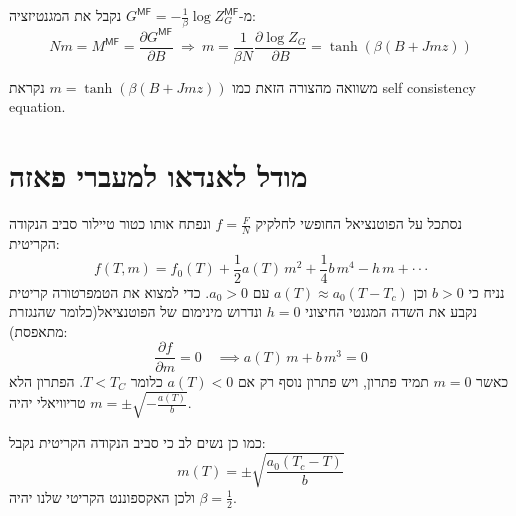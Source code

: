 \documentclass{tstextbook}
\begin{document}
\begin{corollary}
מ-\(G^{\mathsf{M F}}=-\frac{1}{\beta}\log Z_{G}^{\mathsf{M F}}\) נקבל את המגנטיזציה:
$$N m=M^{\mathsf{M F}}=\frac{\partial G^{\mathsf{M F}}}{\partial B}\ \Rightarrow\ m=\frac{1}{\beta N}\frac{\partial\log Z_{G}}{\partial B}=\operatorname{tanh}\left(\beta\left(B+J m z\right)\right)$$

\end{corollary}
\begin{remark}
משוואה מהצורה הזאת כמו \(m=\tanh\left( \beta (B+Jmz) \right)\) נקראת self consistency equation. 

\end{remark}
\section{מודל לאנדאו למעברי פאזה}

נסתכל על הפוטנציאל החופשי לחלקיק \(f=\frac{F}{N}\) ונפתח אותו כטור טיילור סביב הנקודה הקריטית:
$$f(T,m)=f_{0}(T)+{\textstyle{\frac{1}{2}}}a(T)\,m^{2}+{\textstyle{\frac{1}{4}}}b\,m^{4}-h\,m+\cdot\cdot\cdot$$
נניח כי \(b> 0\) וכן \(a(T)\approx a_{0}(T-T_{c})\) עם \(a_{0}> 0\). כדי למצוא את הטמפרטורה קריטית נקבע את השדה המגנטי החיצוני \(h=0\) ונדרוש מינימום של הפוטנציאל(כלומר שהנגזרת מתאפסת):
$$\frac{\partial f}{\partial m}=0\quad\implies a(T)\,m+b\,m^{3}=0$$
כאשר \(m=0\) תמיד פתרון, ויש פתרון נוסף רק אם \(a(T)<0\) כלומר \(T<T_{C}\). הפתרון הלא טריוויאלי יהיה \(m=\pm \sqrt{ -\frac{a(T)}{b} }\). 

כמו כן נשים לב כי סביב הנקודה הקריטית נקבל:
$$m(T)=\pm\sqrt{\frac{a_{0}(T_{c}-T)}{b}}$$
ולכן האקספוננט הקריטי שלנו יהיה \(\beta=\frac{1}{2}\).
\end{document}
